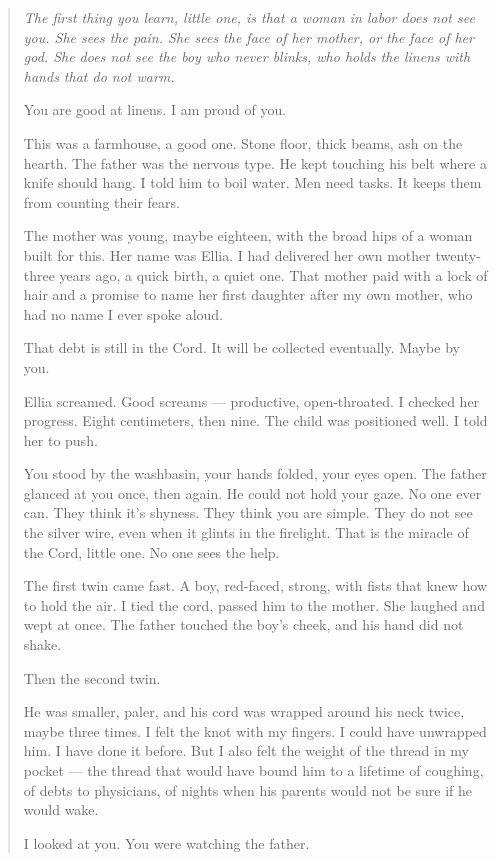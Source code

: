 \documentclass[10pt,twoside]{book}
\newenvironment{storybox}
  {\begin{quote}\itshape\small\setlength{\parskip}{0.5em}}
  {\end{quote}}
\begin{document}
\begin{storybox}
The first thing you learn, little one, is that a woman in labor does not see you. She sees the pain. She sees the face of her mother, or the face of her god. She does not see the boy who never blinks, who holds the linens with hands that do not warm.

You are good at linens. I am proud of you.

This was a farmhouse, a good one. Stone floor, thick beams, ash on the hearth. The father was the nervous type. He kept touching his belt where a knife should hang. I told him to boil water. Men need tasks. It keeps them from counting their fears.

The mother was young, maybe eighteen, with the broad hips of a woman built for this. Her name was Ellia. I had delivered her own mother twenty-three years ago, a quick birth, a quiet one. That mother paid with a lock of hair and a promise to name her first daughter after my own mother, who had no name I ever spoke aloud.

That debt is still in the Cord. It will be collected eventually. Maybe by you.

Ellia screamed. Good screams --- productive, open-throated. I checked her progress. Eight centimeters, then nine. The child was positioned well. I told her to push.

You stood by the washbasin, your hands folded, your eyes open. The father glanced at you once, then again. He could not hold your gaze. No one ever can. They think it's shyness. They think you are simple. They do not see the silver wire, even when it glints in the firelight. That is the miracle of the Cord, little one. No one sees the help.

The first twin came fast. A boy, red-faced, strong, with fists that knew how to hold the air. I tied the cord, passed him to the mother. She laughed and wept at once. The father touched the boy's cheek, and his hand did not shake.

Then the second twin.

He was smaller, paler, and his cord was wrapped around his neck twice, maybe three times. I felt the knot with my fingers. I could have unwrapped him. I have done it before. But I also felt the weight of the thread in my pocket --- the thread that would have bound him to a lifetime of coughing, of debts to physicians, of nights when his parents would not be sure if he would wake.

I looked at you. You were watching the father.


\end{storybox}
\end{document}
